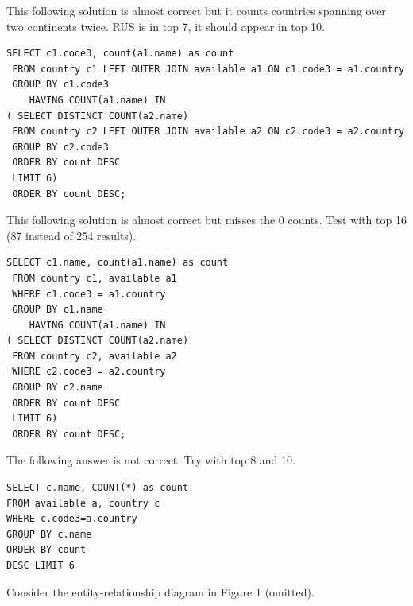 \documentclass[10pt,a4paper,answers]{exam}
\begin{document}
\begin{questions}
\begin{parts}
\begin{solution}
This following solution is almost correct but it counts countries spanning over two continents twice. RUS is in top 7, it should appear in top 10. 
\begin{lstlisting}
SELECT c1.code3, count(a1.name) as count
 FROM country c1 LEFT OUTER JOIN available a1 ON c1.code3 = a1.country
 GROUP BY c1.code3
 	HAVING COUNT(a1.name) IN
( SELECT DISTINCT COUNT(a2.name) 
 FROM country c2 LEFT OUTER JOIN available a2 ON c2.code3 = a2.country
 GROUP BY c2.code3
 ORDER BY count DESC
 LIMIT 6)
 ORDER BY count DESC;
\end{lstlisting}
This following solution is almost correct but misses the 0 counts. Test with top 16 (87 instead of 254 results).
\begin{lstlisting}
SELECT c1.name, count(a1.name) as count
 FROM country c1, available a1
 WHERE c1.code3 = a1.country
 GROUP BY c1.name
 	HAVING COUNT(a1.name) IN
( SELECT DISTINCT COUNT(a2.name) 
 FROM country c2, available a2 
 WHERE c2.code3 = a2.country
 GROUP BY c2.name
 ORDER BY count DESC
 LIMIT 6)
 ORDER BY count DESC;
\end{lstlisting}

The following answer is not correct. Try with top 8 and 10.
\begin{lstlisting}
SELECT c.name, COUNT(*) as count 
FROM available a, country c
WHERE c.code3=a.country
GROUP BY c.name
ORDER BY count 
DESC LIMIT 6
\end{lstlisting}
\end{solution}
\end{parts}


\pagebreak
\question\label{ques:er} Consider the  entity-relationship diagram in Figure 1 (omitted).

\end{questions}
\end{document}
